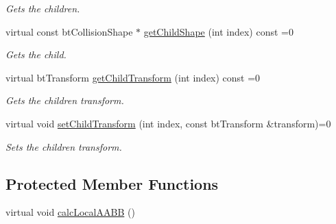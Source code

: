 \begin{DoxyCompactItemize}
\begin{DoxyCompactList}\small\item\em Gets the children. \end{DoxyCompactList}\item 
\hypertarget{classbt_g_impact_shape_interface_a0f89806a197c690e295ba0f60559b015}{virtual const bt\+Collision\+Shape $\ast$ \hyperlink{classbt_g_impact_shape_interface_a0f89806a197c690e295ba0f60559b015}{get\+Child\+Shape} (int index) const =0}\label{classbt_g_impact_shape_interface_a0f89806a197c690e295ba0f60559b015}

\begin{DoxyCompactList}\small\item\em Gets the child. \end{DoxyCompactList}\item 
\hypertarget{classbt_g_impact_shape_interface_ac06b1f597e2b628bf1e0523ab1c62d08}{virtual bt\+Transform \hyperlink{classbt_g_impact_shape_interface_ac06b1f597e2b628bf1e0523ab1c62d08}{get\+Child\+Transform} (int index) const =0}\label{classbt_g_impact_shape_interface_ac06b1f597e2b628bf1e0523ab1c62d08}

\begin{DoxyCompactList}\small\item\em Gets the children transform. \end{DoxyCompactList}\item 
virtual void \hyperlink{classbt_g_impact_shape_interface_a83392f97bd7dfeb71ccdce6913a465b0}{set\+Child\+Transform} (int index, const bt\+Transform \&transform)=0
\begin{DoxyCompactList}\small\item\em Sets the children transform. \end{DoxyCompactList}\end{DoxyCompactItemize}

\subsection*{Protected Member Functions}
\begin{DoxyCompactItemize}
\item 
virtual void \hyperlink{classbt_g_impact_shape_interface_a1712a4613e20aa9249514dcd97f0a086}{calc\+Local\+A\+A\+B\+B} ()
\end{DoxyCompactItemize}
